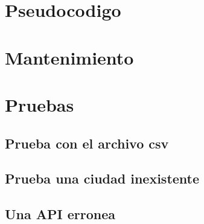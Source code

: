\documentclass[12pt]{article}
\begin{document}
\section{Pseudocodigo}
\begin{algorithmic}[1]
  
  \Else
  \EndIf
\end{algorithmic}
\section{Mantenimiento}
\section{Pruebas}
\subsection{Prueba con el archivo csv}
\subsection{Prueba una ciudad inexistente}
\subsection{Una API erronea}
\end{document}
